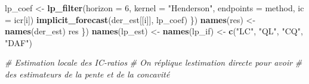 \documentclass[
  12pt,
  a4paper,french]{article}
\newenvironment{Shaded}{\begin{snugshade}}{\end{snugshade}}
\newcommand{\AttributeTok}[1]{\textcolor[rgb]{0.13,0.29,0.53}{#1}}
\newcommand{\CommentTok}[1]{\textcolor[rgb]{0.56,0.35,0.01}{\textit{#1}}}
\newcommand{\DecValTok}[1]{\textcolor[rgb]{0.00,0.00,0.81}{#1}}
\newcommand{\FunctionTok}[1]{\textcolor[rgb]{0.13,0.29,0.53}{\textbf{#1}}}
\newcommand{\NormalTok}[1]{#1}
\newcommand{\OtherTok}[1]{\textcolor[rgb]{0.56,0.35,0.01}{#1}}
\newcommand{\StringTok}[1]{\textcolor[rgb]{0.31,0.60,0.02}{#1}}
\newcommand\1{\mathds{1}}
\begin{document}
\begin{Shaded}
\begin{Highlighting}[]
\NormalTok{    lp\_coef }\OtherTok{\textless{}{-}} \FunctionTok{lp\_filter}\NormalTok{(}\AttributeTok{horizon =} \DecValTok{6}\NormalTok{,}
                         \AttributeTok{kernel =} \StringTok{"Henderson"}\NormalTok{,}
                         \AttributeTok{endpoints =}\NormalTok{ method,}
                         \AttributeTok{ic =}\NormalTok{ icr[i])}
    \FunctionTok{implicit\_forecast}\NormalTok{(der\_est[[i]], lp\_coef)}
\NormalTok{  \})}
  \FunctionTok{names}\NormalTok{(res) }\OtherTok{\textless{}{-}} \FunctionTok{names}\NormalTok{(der\_est)}
\NormalTok{  res}
\NormalTok{\})}
\FunctionTok{names}\NormalTok{(lp\_est) }\OtherTok{\textless{}{-}} \FunctionTok{names}\NormalTok{(lp\_if) }\OtherTok{\textless{}{-}}  \FunctionTok{c}\NormalTok{(}\StringTok{"LC"}\NormalTok{, }\StringTok{"QL"}\NormalTok{, }\StringTok{"CQ"}\NormalTok{, }\StringTok{"DAF"}\NormalTok{)}

\CommentTok{\# Estimation locale des IC{-}ratios }
\CommentTok{\# On réplique l\textquotesingle{}estimation directe pour avoir }
\CommentTok{\# des estimateurs de la pente et de la concavité }


\end{Highlighting}
\end{Shaded}
\end{document}
